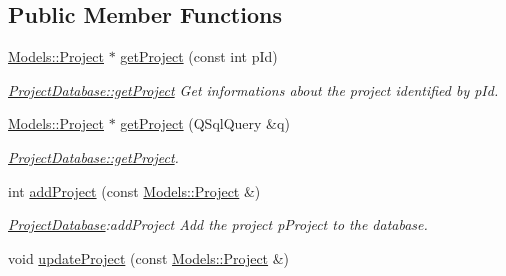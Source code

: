 \subsection*{Public Member Functions}
\begin{DoxyCompactItemize}
\item 
\hyperlink{classModels_1_1Project}{Models\+::\+Project} $\ast$ \hyperlink{classDatabases_1_1ProjectDatabase_a1bf482f645ba7bea80ed6c52bc013a4d}{get\+Project} (const int p\+Id)
\begin{DoxyCompactList}\small\item\em \hyperlink{classDatabases_1_1ProjectDatabase_a1bf482f645ba7bea80ed6c52bc013a4d}{Project\+Database\+::get\+Project} Get informations about the project identified by \textquotesingle{}p\+Id\textquotesingle{}. \end{DoxyCompactList}\item 
\hyperlink{classModels_1_1Project}{Models\+::\+Project} $\ast$ \hyperlink{classDatabases_1_1ProjectDatabase_a165ec8686b565792e01fb79c550e6d4d}{get\+Project} (Q\+Sql\+Query \&q)
\begin{DoxyCompactList}\small\item\em \hyperlink{classDatabases_1_1ProjectDatabase_a1bf482f645ba7bea80ed6c52bc013a4d}{Project\+Database\+::get\+Project}. \end{DoxyCompactList}\item 
int \hyperlink{classDatabases_1_1ProjectDatabase_a270a365c4a9345029447c7a958444dac}{add\+Project} (const \hyperlink{classModels_1_1Project}{Models\+::\+Project} \&)
\begin{DoxyCompactList}\small\item\em \hyperlink{classDatabases_1_1ProjectDatabase}{Project\+Database}\+:add\+Project Add the project \textquotesingle{}p\+Project\textquotesingle{} to the database. \end{DoxyCompactList}\item 
\hypertarget{classDatabases_1_1ProjectDatabase_a0816c768932243906e37045d4640cc8a}{}void \hyperlink{classDatabases_1_1ProjectDatabase_a0816c768932243906e37045d4640cc8a}{update\+Project} (const \hyperlink{classModels_1_1Project}{Models\+::\+Project} \&)\label{classDatabases_1_1ProjectDatabase_a0816c768932243906e37045d4640cc8a}


\end{DoxyCompactItemize}
